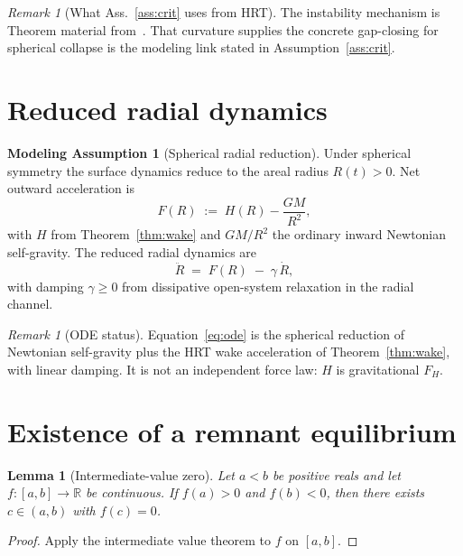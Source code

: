 \documentclass[11pt]{article}
\newtheorem{lemma}[theorem]{Lemma}
\theoremstyle{definition}
\newtheorem{model}[theorem]{Modeling Assumption}
\theoremstyle{remark}
\newtheorem{remark}[theorem]{Remark}
\newcommand{\R}{\mathbb{R}}
\newcommand{\GM}{GM}
\newcommand{\FH}{F_H}
\begin{document}
\begin{remark}[What Ass.~\ref{ass:crit} uses from HRT]
\label{rem:crit}
The instability mechanism is Theorem material from~\cite{boyd2026response}.
That curvature supplies the concrete gap-closing for spherical collapse is the modeling
link stated in Assumption~\ref{ass:crit}.
\end{remark}

\section{Reduced radial dynamics}
\label{sec:radial}
\begin{model}[Spherical radial reduction]
\label{mod:radial}
Under spherical symmetry the surface dynamics reduce to the areal radius $R(t)>0$.
Net outward acceleration is
\begin{equation}
\label{eq:F}
F(R)\;:=\;H(R)-\frac{\GM}{R^{2}},
\end{equation}
with $H$ from Theorem~\ref{thm:wake} and $\GM/R^{2}$ the ordinary inward Newtonian
self-gravity.
The reduced radial dynamics are
\begin{equation}
\label{eq:ode}
\ddot R \;=\; F(R)\;-\;\gamma\,\dot R,
\end{equation}
with damping $\gamma\ge 0$ from dissipative open-system relaxation in the radial channel.
\end{model}

\begin{remark}[ODE status]
\label{rem:ode}
Equation~\eqref{eq:ode} is the spherical reduction of Newtonian self-gravity plus the
HRT wake acceleration of Theorem~\ref{thm:wake}, with linear damping.
It is not an independent force law: $H$ is gravitational $\FH$.
\end{remark}

\section{Existence of a remnant equilibrium}
\label{sec:existence}
\begin{lemma}[Intermediate-value zero]
\label{lem:ivt}
Let $a<b$ be positive reals and let $f:[a,b]\to\R$ be continuous.
If $f(a)>0$ and $f(b)<0$, then there exists $c\in(a,b)$ with $f(c)=0$.
\end{lemma}

\begin{proof}
Apply the intermediate value theorem to $f$ on $[a,b]$.
\end{proof}
\end{document}
